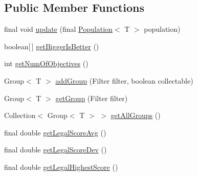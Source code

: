 \subsection*{Public Member Functions}
\begin{DoxyCompactItemize}
\item 
final void \hyperlink{classjenes_1_1population_1_1_population_3_01_t_01extends_01_chromosome_01_4_1_1_statistics_3_01_t_01extends_01_chromosome_01_4_abedb789a305da82d4c7a126cf261144e}{update} (final \hyperlink{classjenes_1_1population_1_1_population_3_01_t_01extends_01_chromosome_01_4_a0f7b4a9eda8a4dadbc70f8585def56bd}{Population}$<$ T $>$ population)
\item 
boolean\mbox{[}$\,$\mbox{]} \hyperlink{classjenes_1_1population_1_1_population_3_01_t_01extends_01_chromosome_01_4_1_1_statistics_3_01_t_01extends_01_chromosome_01_4_ab0d77b3f303f2ca62f590364dd0d5823}{get\-Bigger\-Is\-Better} ()
\item 
int \hyperlink{classjenes_1_1population_1_1_population_3_01_t_01extends_01_chromosome_01_4_1_1_statistics_3_01_t_01extends_01_chromosome_01_4_a9df6ef33f2aebab13496fb6ac4da00c0}{get\-Num\-Of\-Objectives} ()
\item 
Group$<$ T $>$ \hyperlink{classjenes_1_1population_1_1_population_3_01_t_01extends_01_chromosome_01_4_1_1_statistics_3_01_t_01extends_01_chromosome_01_4_a54d341d21467800ce5cd2adcf57d88ae}{add\-Group} (Filter filter, boolean collectable)
\item 
Group$<$ T $>$ \hyperlink{classjenes_1_1population_1_1_population_3_01_t_01extends_01_chromosome_01_4_1_1_statistics_3_01_t_01extends_01_chromosome_01_4_a53c79dcd727e0928302b8bd7c5a84351}{get\-Group} (Filter filter)
\item 
Collection$<$ Group$<$ T $>$ $>$ \hyperlink{classjenes_1_1population_1_1_population_3_01_t_01extends_01_chromosome_01_4_1_1_statistics_3_01_t_01extends_01_chromosome_01_4_a339616b1e3990e690f70013d89eb99f6}{get\-All\-Groups} ()
\item 
final double \hyperlink{classjenes_1_1population_1_1_population_3_01_t_01extends_01_chromosome_01_4_1_1_statistics_3_01_t_01extends_01_chromosome_01_4_a491f56a06175de4ef0fe47d6d081643e}{get\-Legal\-Score\-Avg} ()
\item 
final double \hyperlink{classjenes_1_1population_1_1_population_3_01_t_01extends_01_chromosome_01_4_1_1_statistics_3_01_t_01extends_01_chromosome_01_4_a290e9cbf8463eb2ac0437ff1488789a7}{get\-Legal\-Score\-Dev} ()
\item 
final double \hyperlink{classjenes_1_1population_1_1_population_3_01_t_01extends_01_chromosome_01_4_1_1_statistics_3_01_t_01extends_01_chromosome_01_4_a7e81422bcbba41e5da9038bdb4b3a36c}{get\-Legal\-Highest\-Score} ()

\end{DoxyCompactItemize}

